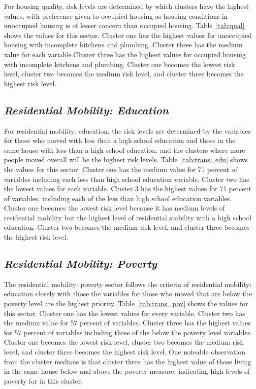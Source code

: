 For housing quality, risk levels are determined by which clusters have the highest values, with preference given to occupied housing as housing conditions in unoccupied housing is of lesser concern than occupied housing. Table~\ref{tab:qual} shows the values for this sector. Cluster one has the highest values for unoccupied housing with incomplete kitchens and plumbing. Cluster three has the medium value for each variable.Cluster three has the highest values for occupied housing with incomplete kitchens and plumbing. Cluster one becomes the lowest risk level, cluster two becomes the medium risk level, and cluster three becomes the highest risk level. 





\subsection{\textit{Residential Mobility: Education}}
For residential mobility: education, the risk levels are determined by the variables for those who moved with less than a high school education and those in the same house with less than a high school education, and the clusters where more people moved overall will be the highest risk levels. Table~\ref{tab:trans_edu} shows the values for this sector. Cluster one has the medium value for 71 percent of variables including each less than high school education variable. Cluster two has the lowest values for each variable. Cluster 3 has the highest values for 71 percent of variables, including each of the less than high school education variables. Cluster one becomes the lowest risk level because it has medium levels of residential mobility but the highest level of residential stability with a high school education. Cluster two becomes the medium risk level, and cluster three becomes the highest risk level. 




\subsection{\textit{Residential Mobility: Poverty}}

The residential mobility: poverty sector follows the criteria of residential mobility: education closely with those the variables for those who moved that are below the poverty level are the highest priority. Table~\ref{tab:trans_pov} shows the values for this sector. Cluster one has the lowest values for every variable. Cluster two has the medium value for 57 percent of variables. Cluster three has the highest values for 57 percent of variables including three of the below the poverty level variables. Cluster one becomes the lowest risk level, cluster two becomes the medium risk level, and cluster three becomes the highest risk level. One noteable observation from the cluster medians is that cluster three has the highest value of those living in the same house below and above the poverty measure, indicating high levels of poverty for \cts in this cluster.

